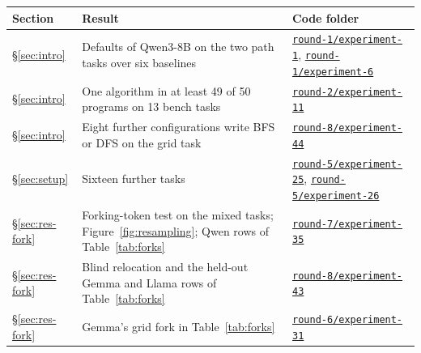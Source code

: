 \documentclass[11pt,letterpaper]{article}
\begin{document}
{\footnotesize
\begin{longtable}{@{}L{2.1cm}L{8.9cm}L{4.6cm}@{}}
\toprule
Section & Result & Code folder \\
\midrule
\endhead
\bottomrule
\endfoot
\S\ref{sec:intro} & Defaults of Qwen3-8B on the two path tasks over six baselines & \href{https://github.com/ai-inventor-papers/ai-invention-295f8e-prompt-bans-substitute-not-just-subtract/tree/fork/run_jSassd-YWLVC/round-1/experiment-1}{\texttt{round-1/experiment-1}}, \href{https://github.com/ai-inventor-papers/ai-invention-295f8e-prompt-bans-substitute-not-just-subtract/tree/fork/run_jSassd-YWLVC/round-1/experiment-6}{\texttt{round-1/experiment-6}} \\
\S\ref{sec:intro} & One algorithm in at least 49 of 50 programs on 13 bench tasks & \href{https://github.com/ai-inventor-papers/ai-invention-295f8e-prompt-bans-substitute-not-just-subtract/tree/fork/run_jSassd-YWLVC/round-2/experiment-11}{\texttt{round-2/experiment-11}} \\
\S\ref{sec:intro} & Eight further configurations write BFS or DFS on the grid task & \href{https://github.com/ai-inventor-papers/ai-invention-295f8e-prompt-bans-substitute-not-just-subtract/tree/fork/run_jSassd-YWLVC/round-8/experiment-44}{\texttt{round-8/experiment-44}} \\
\S\ref{sec:setup} & Sixteen further tasks & \href{https://github.com/ai-inventor-papers/ai-invention-295f8e-prompt-bans-substitute-not-just-subtract/tree/fork/run_jSassd-YWLVC/round-5/experiment-25}{\texttt{round-5/experiment-25}}, \href{https://github.com/ai-inventor-papers/ai-invention-295f8e-prompt-bans-substitute-not-just-subtract/tree/fork/run_jSassd-YWLVC/round-5/experiment-26}{\texttt{round-5/experiment-26}} \\
\S\ref{sec:res-fork} & Forking-token test on the mixed tasks; Figure~\ref{fig:resampling}; Qwen rows of Table~\ref{tab:forks} & \href{https://github.com/ai-inventor-papers/ai-invention-295f8e-prompt-bans-substitute-not-just-subtract/tree/fork/run_jSassd-YWLVC/round-7/experiment-35}{\texttt{round-7/experiment-35}} \\
\S\ref{sec:res-fork} & Blind relocation and the held-out Gemma and Llama rows of Table~\ref{tab:forks} & \href{https://github.com/ai-inventor-papers/ai-invention-295f8e-prompt-bans-substitute-not-just-subtract/tree/fork/run_jSassd-YWLVC/round-8/experiment-43}{\texttt{round-8/experiment-43}} \\
\S\ref{sec:res-fork} & Gemma's grid fork in Table~\ref{tab:forks} & \href{https://github.com/ai-inventor-papers/ai-invention-295f8e-prompt-bans-substitute-not-just-subtract/tree/fork/run_jSassd-YWLVC/round-6/experiment-31}{\texttt{round-6/experiment-31}} \\

\end{longtable}}
\end{document}
